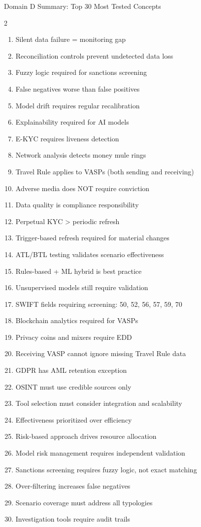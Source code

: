 \documentclass[11pt,a4paper]{beamer}
\begin{document}
\begin{frame}{Domain D Summary: Top 30 Most Tested Concepts}
	\begin{multicols}{2}
		\begin{enumerate}
			\item Silent data failure = monitoring gap
			\item Reconciliation controls prevent undetected data loss
			\item Fuzzy logic required for sanctions screening
			\item False negatives worse than false positives
			\item Model drift requires regular recalibration
			\item Explainability required for AI models
			\item E-KYC requires liveness detection
			\item Network analysis detects money mule rings
			\item Travel Rule applies to VASPs (both sending and receiving)
			\item Adverse media does NOT require conviction
			\item Data quality is compliance responsibility
			\item Perpetual KYC > periodic refresh
			\item Trigger-based refresh required for material changes
			\item ATL/BTL testing validates scenario effectiveness
			\item Rules-based + ML hybrid is best practice
			\item Unsupervised models still require validation
			\item SWIFT fields requiring screening: 50, 52, 56, 57, 59, 70
			\item Blockchain analytics required for VASPs
			\item Privacy coins and mixers require EDD
			\item Receiving VASP cannot ignore missing Travel Rule data
			\item GDPR has AML retention exception
			\item OSINT must use credible sources only
			\item Tool selection must consider integration and scalability
			\item Effectiveness prioritized over efficiency
			\item Risk-based approach drives resource allocation
			\item Model risk management requires independent validation
			\item Sanctions screening requires fuzzy logic, not exact matching
			\item Over-filtering increases false negatives
			\item Scenario coverage must address all typologies
			\item Investigation tools require audit trails
		\end{enumerate}
	\end{multicols}
\end{frame}
\end{document}

